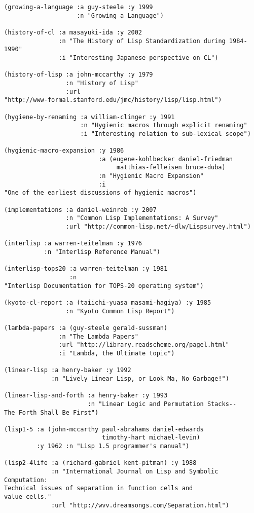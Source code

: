 \begin{verbatim}
(growing-a-language :a guy-steele :y 1999
                    :n "Growing a Language")

(history-of-cl :a masayuki-ida :y 2002
               :n "The History of Lisp Standardization during 1984-1990"
               :i "Interesting Japanese perspective on CL")

(history-of-lisp :a john-mccarthy :y 1979
                 :n "History of Lisp"
                 :url
"http://www-formal.stanford.edu/jmc/history/lisp/lisp.html")

(hygiene-by-renaming :a william-clinger :y 1991
                     :n "Hygienic macros through explicit renaming"
                     :i "Interesting relation to sub-lexical scope")

(hygienic-macro-expansion :y 1986
                          :a (eugene-kohlbecker daniel-friedman
                               matthias-felleisen bruce-duba)
                          :n "Hygienic Macro Expansion"
                          :i
"One of the earliest discussions of hygienic macros")

(implementations :a daniel-weinreb :y 2007
                 :n "Common Lisp Implementations: A Survey"
                 :url "http://common-lisp.net/~dlw/Lispsurvey.html")

(interlisp :a warren-teitelman :y 1976
           :n "Interlisp Reference Manual")

(interlisp-tops20 :a warren-teitelman :y 1981
                  :n
"Interlisp Documentation for TOPS-20 operating system")

(kyoto-cl-report :a (taiichi-yuasa masami-hagiya) :y 1985
                 :n "Kyoto Common Lisp Report")

(lambda-papers :a (guy-steele gerald-sussman)
               :n "The Lambda Papers"
               :url "http://library.readscheme.org/pagel.html"
               :i "Lambda, the Ultimate topic")

(linear-lisp :a henry-baker :y 1992
             :n "Lively Linear Lisp, or Look Ma, No Garbage!")

(linear-lisp-and-forth :a henry-baker :y 1993
                       :n "Linear Logic and Permutation Stacks--
The Forth Shall Be First")

(lisp1-5 :a (john-mccarthy paul-abrahams daniel-edwards
                           timothy-hart michael-levin)
         :y 1962 :n "Lisp 1.5 programmer's manual")

(lisp2-4life :a (richard-gabriel kent-pitman) :y 1988
             :n "International Journal on Lisp and Symbolic Computation:
Technical issues of separation in function cells and
value cells."
             :url "http://wvv.dreamsongs.com/Separation.html")


\end{verbatim}
